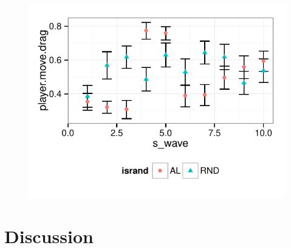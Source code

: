 \documentclass[letterpaper]{article}
\begin{document}



\begin{figure}[tbph]
\centering
\includegraphics[width=\linewidth]{pref_drag}
\caption{}
\label{fig:pref_drag}
\end{figure}




\section{Discussion}

\end{document}
